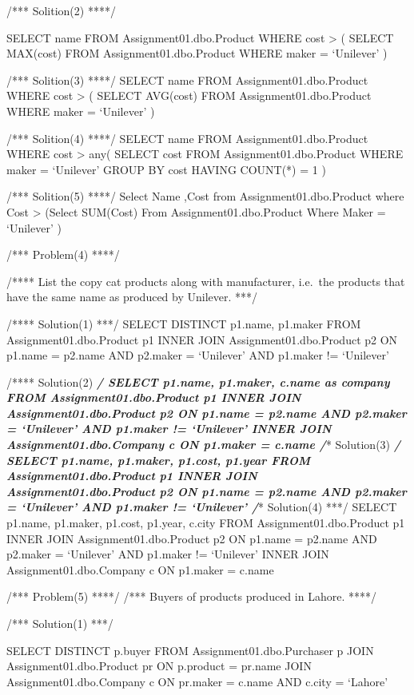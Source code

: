 /*** Solition(2) ****/

SELECT name FROM Assignment01.dbo.Product WHERE cost \textgreater{} (
SELECT MAX(cost) FROM Assignment01.dbo.Product WHERE maker = `Unilever'
)

/*** Solition(3) ****/ SELECT name FROM Assignment01.dbo.Product WHERE
cost \textgreater{} ( SELECT AVG(cost) FROM Assignment01.dbo.Product
WHERE maker = `Unilever' )

/*** Solition(4) ****/ SELECT name FROM Assignment01.dbo.Product WHERE
cost \textgreater{} any( SELECT cost FROM Assignment01.dbo.Product WHERE
maker = `Unilever' GROUP BY cost HAVING COUNT(*) = 1 )

/*** Solition(5) ****/ Select Name ,Cost from Assignment01.dbo.Product
where Cost \textgreater{} (Select SUM(Cost) From
Assignment01.dbo.Product Where Maker = `Unilever' )

/*** Problem(4) ****/

/**** List the copy cat products along with manufacturer, i.e.~the
products that have the same name as produced by Unilever. ***/

/**** Solution(1) ***/ SELECT DISTINCT p1.name, p1.maker FROM
Assignment01.dbo.Product p1 INNER JOIN Assignment01.dbo.Product p2 ON
p1.name = p2.name AND p2.maker = `Unilever' AND p1.maker != `Unilever'

/**** Solution(2) \textbf{\emph{/ SELECT p1.name, p1.maker, c.name as
company FROM Assignment01.dbo.Product p1 INNER JOIN
Assignment01.dbo.Product p2 ON p1.name = p2.name AND p2.maker =
`Unilever' AND p1.maker != `Unilever' INNER JOIN
Assignment01.dbo.Company c ON p1.maker = c.name /}}* Solution(3)
\textbf{\emph{/ SELECT p1.name, p1.maker, p1.cost, p1.year FROM
Assignment01.dbo.Product p1 INNER JOIN Assignment01.dbo.Product p2 ON
p1.name = p2.name AND p2.maker = `Unilever' AND p1.maker != `Unilever'
/}}* Solution(4) ***/ SELECT p1.name, p1.maker, p1.cost, p1.year, c.city
FROM Assignment01.dbo.Product p1 INNER JOIN Assignment01.dbo.Product p2
ON p1.name = p2.name AND p2.maker = `Unilever' AND p1.maker !=
`Unilever' INNER JOIN Assignment01.dbo.Company c ON p1.maker = c.name

/*** Problem(5) ****/ /*** Buyers of products produced in Lahore. ****/

/*** Solution(1) ***/

SELECT DISTINCT p.buyer FROM Assignment01.dbo.Purchaser p JOIN
Assignment01.dbo.Product pr ON p.product = pr.name JOIN
Assignment01.dbo.Company c ON pr.maker = c.name AND c.city = `Lahore'

